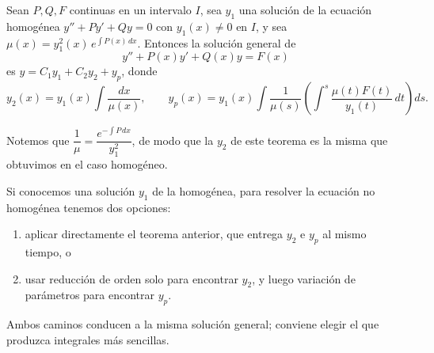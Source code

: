\begin{theorem}
    Sean $P,Q,F$ continuas en un intervalo $I$, sea $y_1$ una soluci\'on de la ecuaci\'on homog\'enea $y''+Py'+Qy=0$ con $y_1(x)\neq0$ en $I$, y sea $\mu(x)=y_1^2(x)\,e^{\int P(x)\,dx}$. Entonces la soluci\'on general de
    \[
    y''+P(x)y'+Q(x)y=F(x)
    \]
    es $y=C_1y_1+C_2y_2+y_p$, donde
    \[
    y_2(x)=y_1(x)\int\dfrac{dx}{\mu(x)},\qquad y_p(x)=y_1(x)\int\dfrac{1}{\mu(s)}\left(\int^{s}\dfrac{\mu(t)F(t)}{y_1(t)}\,dt\right)ds.
    \]
\end{theorem}

Notemos que $\dfrac{1}{\mu}=\dfrac{e^{-\int P\,dx}}{y_1^2}$, de modo que la $y_2$ de este teorema es la misma que obtuvimos en el caso homog\'eneo.

\begin{remark}
    Si conocemos una soluci\'on $y_1$ de la homog\'enea, para resolver la ecuaci\'on no homog\'enea tenemos dos opciones:
    \begin{enumerate}[label=\roman*)]
        \item aplicar directamente el teorema anterior, que entrega $y_2$ e $y_p$ al mismo tiempo, o
        \item usar reducci\'on de orden solo para encontrar $y_2$, y luego variaci\'on de par\'ametros para encontrar $y_p$.
    \end{enumerate}
    Ambos caminos conducen a la misma soluci\'on general; conviene elegir el que produzca integrales m\'as sencillas.
\end{remark}

